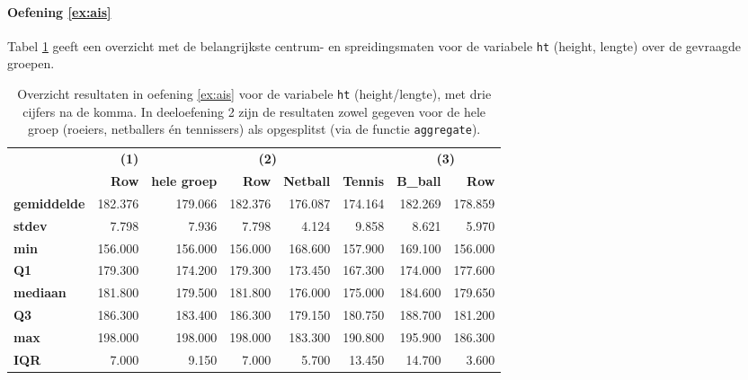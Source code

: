 \paragraph{Oefening \ref{ex:ais}}

Tabel \ref{tab:opl-ais-ht} geeft een overzicht met de belangrijkste centrum- en spreidingsmaten voor de variabele \texttt{ht} (height, lengte) over de gevraagde groepen.

\begin{table}
  \centering
  \begin{tabular}{@{}l|r|rrrr|rr@{}}
    \toprule
    & \textbf{(1)} & \multicolumn{4}{c}{\textbf{(2)}}                                                 & \multicolumn{2}{c}{\textbf{(3)}} \\ 
    & \textbf{Row} & \textbf{hele groep} & \textbf{Row} & \textbf{Netball} & \textbf{Tennis} & \textbf{B\_ball}  & \textbf{Row} \\ \midrule
    \textbf{gemiddelde} & 182.376      & 179.066                      & 182.376      & 176.087          & 174.164         & 182.269           & 178.859      \\
    \textbf{stdev}      & 7.798        & 7.936                        & 7.798        & 4.124            & 9.858           & 8.621             & 5.970        \\
    \textbf{min}        & 156.000      & 156.000                      & 156.000      & 168.600          & 157.900         & 169.100           & 156.000      \\
    \textbf{Q1}         & 179.300      & 174.200                      & 179.300      & 173.450          & 167.300         & 174.000           & 177.600      \\
    \textbf{mediaan}    & 181.800      & 179.500                      & 181.800      & 176.000          & 175.000         & 184.600           & 179.650      \\
    \textbf{Q3}         & 186.300      & 183.400                      & 186.300      & 179.150          & 180.750         & 188.700           & 181.200      \\
    \textbf{max}        & 198.000      & 198.000                      & 198.000      & 183.300          & 190.800         & 195.900           & 186.300      \\
    \textbf{IQR}        & 7.000        & 9.150                        & 7.000        & 5.700            & 13.450          & 14.700            & 3.600        \\ \bottomrule
  \end{tabular}
  \caption{Overzicht resultaten in oefening \ref{ex:ais} voor de variabele \texttt{ht} (height/lengte), met drie cijfers na de komma. In deeloefening 2 zijn de resultaten zowel gegeven voor de hele groep (roeiers, netballers én tennissers) als opgesplitst (via de functie \texttt{aggregate}).}
  \label{tab:opl-ais-ht}
\end{table}

